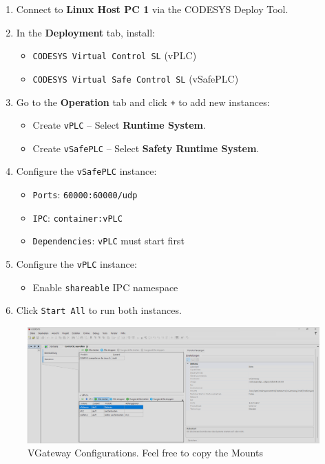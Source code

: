 \documentclass[a4paper,12pt]{article}
\begin{document}
\begin{enumerate}
	\item Connect to \textbf{Linux Host PC 1} via the CODESYS Deploy Tool.
	\item In the \textbf{Deployment} tab, install:
	\begin{itemize}
		\item \texttt{CODESYS Virtual Control SL} (vPLC)
		\item \texttt{CODESYS Virtual Safe Control SL} (vSafePLC)
	\end{itemize}
	\item Go to the \textbf{Operation} tab and click \texttt{+} to add new instances:
	\begin{itemize}
		\item Create \texttt{vPLC} – Select \textbf{Runtime System}.
		\item Create \texttt{vSafePLC} – Select \textbf{Safety Runtime System}.
	\end{itemize}
	\item Configure the \texttt{vSafePLC} instance:
	\begin{itemize}
		\item \texttt{Ports}: \texttt{60000:60000/udp}
		\item \texttt{IPC}: \texttt{container:vPLC}
		\item \texttt{Dependencies}: \texttt{vPLC} must start first
	\end{itemize}
	\item Configure the \texttt{vPLC} instance:
	\begin{itemize}
		\item Enable \texttt{shareable} IPC namespace
	\end{itemize}
	\item Click \texttt{Start All} to run both instances.
\end{enumerate}

\begin{figure}[H]
	\centering
	\includegraphics[width=1\textwidth]{6.PNG}
	\caption{VGateway Configurations. Feel free to copy the Mounts}
\end{figure}
\end{document}
